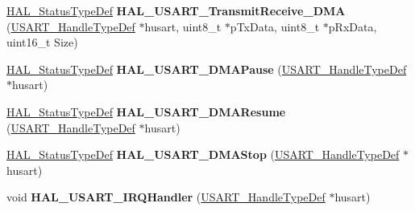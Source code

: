 \begin{DoxyCompactItemize}
\item 
\hyperlink{stm32f4xx__hal__def_8h_a63c0679d1cb8b8c684fbb0632743478f}{H\+A\+L\+\_\+\+Status\+Type\+Def} {\bfseries H\+A\+L\+\_\+\+U\+S\+A\+R\+T\+\_\+\+Transmit\+Receive\+\_\+\+D\+MA} (\hyperlink{struct_u_s_a_r_t___handle_type_def}{U\+S\+A\+R\+T\+\_\+\+Handle\+Type\+Def} $\ast$husart, uint8\+\_\+t $\ast$p\+Tx\+Data, uint8\+\_\+t $\ast$p\+Rx\+Data, uint16\+\_\+t Size)\hypertarget{group___u_s_a_r_t___exported___functions___group2_ga8ad37a3c54b720f1f0a2a32dafcac6df}{}\label{group___u_s_a_r_t___exported___functions___group2_ga8ad37a3c54b720f1f0a2a32dafcac6df}

\item 
\hyperlink{stm32f4xx__hal__def_8h_a63c0679d1cb8b8c684fbb0632743478f}{H\+A\+L\+\_\+\+Status\+Type\+Def} {\bfseries H\+A\+L\+\_\+\+U\+S\+A\+R\+T\+\_\+\+D\+M\+A\+Pause} (\hyperlink{struct_u_s_a_r_t___handle_type_def}{U\+S\+A\+R\+T\+\_\+\+Handle\+Type\+Def} $\ast$husart)\hypertarget{group___u_s_a_r_t___exported___functions___group2_gab6d960d952daee0b6aa82fbf0a4b61b0}{}\label{group___u_s_a_r_t___exported___functions___group2_gab6d960d952daee0b6aa82fbf0a4b61b0}

\item 
\hyperlink{stm32f4xx__hal__def_8h_a63c0679d1cb8b8c684fbb0632743478f}{H\+A\+L\+\_\+\+Status\+Type\+Def} {\bfseries H\+A\+L\+\_\+\+U\+S\+A\+R\+T\+\_\+\+D\+M\+A\+Resume} (\hyperlink{struct_u_s_a_r_t___handle_type_def}{U\+S\+A\+R\+T\+\_\+\+Handle\+Type\+Def} $\ast$husart)\hypertarget{group___u_s_a_r_t___exported___functions___group2_ga20e7a0e7864825eb18c9ee57a4e63fb7}{}\label{group___u_s_a_r_t___exported___functions___group2_ga20e7a0e7864825eb18c9ee57a4e63fb7}

\item 
\hyperlink{stm32f4xx__hal__def_8h_a63c0679d1cb8b8c684fbb0632743478f}{H\+A\+L\+\_\+\+Status\+Type\+Def} {\bfseries H\+A\+L\+\_\+\+U\+S\+A\+R\+T\+\_\+\+D\+M\+A\+Stop} (\hyperlink{struct_u_s_a_r_t___handle_type_def}{U\+S\+A\+R\+T\+\_\+\+Handle\+Type\+Def} $\ast$husart)\hypertarget{group___u_s_a_r_t___exported___functions___group2_gabeaf40f697cb852cb54a3ad81df4375e}{}\label{group___u_s_a_r_t___exported___functions___group2_gabeaf40f697cb852cb54a3ad81df4375e}

\item 
void {\bfseries H\+A\+L\+\_\+\+U\+S\+A\+R\+T\+\_\+\+I\+R\+Q\+Handler} (\hyperlink{struct_u_s_a_r_t___handle_type_def}{U\+S\+A\+R\+T\+\_\+\+Handle\+Type\+Def} $\ast$husart)\hypertarget{group___u_s_a_r_t___exported___functions___group2_ga4ac0981601603af111c7e59db1680ace}{}\label{group___u_s_a_r_t___exported___functions___group2_ga4ac0981601603af111c7e59db1680ace}


\end{DoxyCompactItemize}
